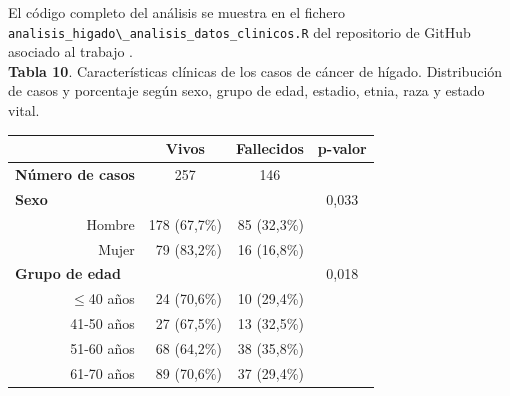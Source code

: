 El código completo del análisis se muestra en el fichero \texttt{analisis\_higado\textbackslash{}\_analisis\_datos\_clinicos.R} del repositorio de GitHub asociado al trabajo \cite{Redondo-Sanchez2020}.\\

\textbf{Tabla 10}. Características clínicas de los casos de cáncer de hígado. Distribución de casos y porcentaje según sexo, grupo de edad, estadio, etnia, raza y estado vital.

\begin{table}[H]
	\centering
	\begin{tabular}{rrrc}
		\cline{2-4}
		\multicolumn{1}{l}{}                           & \multicolumn{1}{c}{\textbf{Vivos}} & \multicolumn{1}{c}{\textbf{Fallecidos}} & \multicolumn{1}{l}{\textbf{p-valor}} \\ \hline
		\multicolumn{1}{l}{\textbf{Número de casos}} & \multicolumn{1}{c}{257}            & \multicolumn{1}{c}{146}     & \multicolumn{1}{l}{}                     \\ \hline
		\multicolumn{1}{l}{\textbf{Sexo}}              &                           &                             & 0,033                                    \\
		Hombre                                         & 178 (67,7\%)              & 85 (32,3\%)                 &                                          \\
		Mujer                                          & 79 (83,2\%)               & 16 (16,8\%)                 &                                          \\ \hline
		\multicolumn{1}{l}{\textbf{Grupo de edad}}     &                           &                             & 0,018                                    \\
		$\leq$40 años                                      & 24 (70,6\%)               & 10 (29,4\%)                 &                                          \\
		41-50 años                                     & 27 (67,5\%)               & 13 (32,5\%)                 &                                          \\
		51-60 años                                     & 68 (64,2\%)               & 38 (35,8\%)                 &                                          \\
		61-70 años                                     & 89 (70,6\%)               & 37 (29,4\%)                 &                                          \\

\end{tabular}
\end{table}
